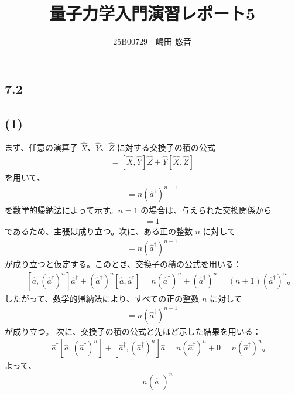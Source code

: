 \documentclass[platex,dvipdfmx,a4paper]{jsarticle}
\title{量子力学入門演習レポート5}
\author{25B00729　嶋田 悠音}
\begin{document}
\maketitle

\subsection*{7.2}
\subsection*{(1)}

まず、任意の演算子 \(\hat{X}\)、\(\hat{Y}\)、\(\hat{Z}\) に対する交換子の積の公式
\begin{align*}
  [\hat{X},\hat{Y}\hat{Z}]=[\hat{X},\hat{Y}]\hat{Z}+\hat{Y}[\hat{X},\hat{Z}]
\end{align*}
を用いて、
\begin{align*}
  [\hat{a},(\hat{a}^{\dagger})^n]=n(\hat{a}^{\dagger})^{n-1}
\end{align*}
を数学的帰納法によって示す。\(n=1\) の場合は、与えられた交換関係から
\begin{align*}
  [\hat{a},\hat{a}^{\dagger}]=1
\end{align*}
であるため、主張は成り立つ。次に、ある正の整数 \(n\) に対して
\begin{align*}
  [\hat{a},(\hat{a}^{\dagger})^n]=n(\hat{a}^{\dagger})^{n-1}
\end{align*}
が成り立つと仮定する。このとき、交換子の積の公式を用いる：
\begin{align*}
  [\hat{a},(\hat{a}^{\dagger})^{n+1}]&=[\hat{a},(\hat{a}^{\dagger})^n]\hat{a}^{\dagger}+(\hat{a}^{\dagger})^n[\hat{a},\hat{a}^{\dagger}]=n(\hat{a}^{\dagger})^n+(\hat{a}^{\dagger})^n=(n+1)(\hat{a}^{\dagger})^n。
\end{align*}
したがって、数学的帰納法により、すべての正の整数 \(n\) に対して
\begin{align*}
  [\hat{a},(\hat{a}^{\dagger})^n]=n(\hat{a}^{\dagger})^{n-1}
\end{align*}
が成り立つ。
次に、交換子の積の公式と先ほど示した結果を用いる：
\begin{align*}
  [\hat{a}^{\dagger}\hat{a},(\hat{a}^{\dagger})^n]&=\hat{a}^{\dagger}[\hat{a},(\hat{a}^{\dagger})^n]+[\hat{a}^{\dagger},(\hat{a}^{\dagger})^n]\hat{a}=n(\hat{a}^{\dagger})^n+0=n(\hat{a}^{\dagger})^n。
\end{align*}
よって、
\begin{align*}
  [\hat{a}^{\dagger}\hat{a},(\hat{a}^{\dagger})^n]=n(\hat{a}^{\dagger})^n
\end{align*}
\end{document}
